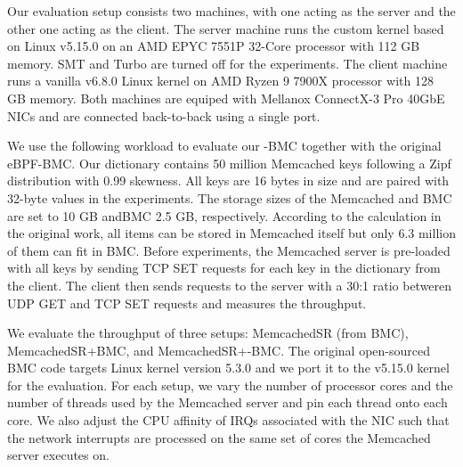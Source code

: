 Our evaluation setup consists two machines, with one
    acting as the server and the other one acting as the client.
The server machine runs the \projname{} custom kernel based on Linux v5.15.0 on
    an AMD EPYC 7551P 32-Core processor with 112 GB memory.
SMT and Turbo are turned off for the experiments.
The client machine runs a vanilla v6.8.0 Linux kernel on AMD Ryzen 9 7900X
    processor with 128 GB memory.
Both machines are equiped with Mellanox ConnectX-3 Pro 40GbE NICs and are
    connected back-to-back using a single port.


We use the following workload to evaluate our \projname{}-BMC together with the
    original eBPF-BMC.
Our dictionary contains 50 million Memcached keys following a Zipf
    distribution with 0.99 skewness.
All keys are 16 bytes in size and are paired with 32-byte values in the
    experiments.
The storage sizes of the Memcached and BMC are set to 10 GB andBMC 2.5 GB,
    respectively.
According to the calculation in the original work, all items
    can be stored in Memcached itself but only 6.3 million of them can fit in
    BMC.
Before experiments, the Memcached server is pre-loaded with all keys by
    sending TCP SET requests for each key in the dictionary from the client.
The client then sends requests to the server with a 30:1 ratio betweren UDP GET and
    TCP SET requests and measures the throughput.

We evaluate the throughput of three setups: MemcachedSR (from BMC),
    MemcachedSR+BMC, and MemcachedSR+\projname{}-BMC.
The original open-sourced BMC code targets Linux kernel version 5.3.0 and we
    port it to the v5.15.0 \projname{} kernel for the evaluation.
For each setup, we vary the number of processor cores and the number of threads
    used by the Memcached server and pin each thread onto each core.
We also adjust the CPU affinity of IRQs associated with the NIC such that the
    network interrupts are processed on the same set of cores the Memcached
    server executes on.

